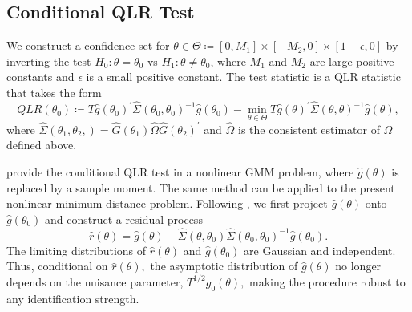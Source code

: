 \subsection{Conditional QLR Test}\label{sec:conditional QLR}

We construct a confidence set for $\theta \in \Theta \coloneqq [0, M_1] \times [-M_2, 0] \times [1 - \epsilon, 0]$ by inverting the test $ H_{0}: \theta =\theta_{0}$ vs $H_{1}: \theta \neq \theta _{0}$, where $M_1$ and $M_2$ are large positive constants and $\epsilon$ is a small positive constant. The test statistic is a QLR statistic that takes the form
%
\begin{equation}
    QLR(\theta _{0}) \coloneqq T\widehat{g}(\theta _{0})^{\prime}\widehat{\Sigma} (\theta _{0},\theta _{0})^{-1}\widehat{g}(\theta _{0})-\underset{\theta \in \Theta }{\min }T\widehat{g}(\theta )^{\prime }\widehat{\Sigma } (\theta ,\theta )^{-1}\widehat{g}(\theta ),  
    \label{QLR stat}
\end{equation}
%
where $\widehat{\Sigma }(\theta _{1},\theta _{2},)=\widehat{G}(\theta _{1})\widehat{\Omega }\widehat{G}(\theta _{2})^{\prime }$ and $\widehat{ \Omega }$ is the consistent estimator of $\Omega $ defined above.

\Textcite{andrews2016conditional} provide the conditional QLR test in a nonlinear GMM problem, where $\widehat{g}(\theta )$ is replaced by a sample moment. The same method can be applied to the present nonlinear minimum distance problem. Following \textcite{andrews2016conditional}, we first project $\widehat{g}(\theta )$ onto $\widehat{g}(\theta _{0})$ and construct a residual process
%
\begin{equation}
    \widehat{r}(\theta )=\widehat{g}(\theta )-\widehat{\Sigma }(\theta ,\theta _{0})\widehat{\Sigma }(\theta _{0},\theta _{0})^{-1}\widehat{g} (\theta _{0}).  
    \label{red process}
\end{equation}
%
The limiting distributions of $\widehat{r}(\theta )$ and $\widehat{g} (\theta _{0})$ are Gaussian and independent. Thus, conditional on $\widehat{ r}(\theta ),$ the asymptotic distribution of $\widehat{g}(\theta )$ no longer depends on the nuisance parameter, $T^{1/2}g_{0}(\theta ),$ making the procedure robust to any identification strength.


